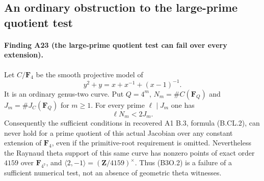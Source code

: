 \documentclass[11pt,a4paper]{article}
\begin{document}
\subsection{An ordinary obstruction to the large-prime quotient test}
\label{sec:b3-ordinary-obstruction}

\paragraph{Finding A23 (the large-prime quotient test can fail over every extension).}
Let $C/\mathbf F_4$ be the smooth projective model of
\[
                   y^2+y=x+x^{-1}+(x-1)^{-1}.
 \tag{B3O.1}
\]
It is an ordinary genus-two curve.  Put
$Q=4^m$, $N_m=\#C(\mathbf F_Q)$ and
$J_m=\#J_C(\mathbf F_Q)$ for $m\ge1$.
For every prime $\ell\mid J_m$ one has
\[
                              \ell N_m<2J_m.
 \tag{B3O.2}
\]
Consequently the sufficient conditions in recovered A1
B.3, formula (B.CL.2), can never hold for a prime quotient
of this actual Jacobian over any constant extension of
$\mathbf F_4$, even if the primitive-root requirement is omitted.
Nevertheless the Raynaud theta support of this same curve has
nonzero points of exact order $4159$ over $\mathbf F_{4^7}$,
and $\langle2,-1\rangle=(\mathbf Z/4159)^\times$.
Thus (B3O.2) is a failure of a sufficient numerical test, not
an absence of geometric theta witnesses.
\end{document}
